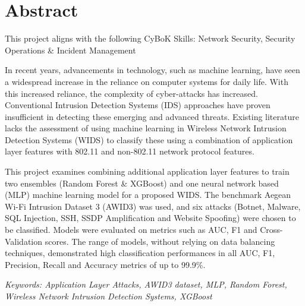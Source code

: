 
\section*{Abstract}
\vspace{1cm}



\begin{center}
	{\small This project aligns with the following CyBoK Skills: Network Security, Security Operations \& Incident Management }
	\vspace{10mm}
\end{center}

 \noindent In recent years, advancements in technology, such as machine learning, have seen a widespread increase in the reliance on computer systems for daily life. With this increased reliance, the complexity of cyber-attacks has increased. Conventional Intrusion Detection Systems (IDS) approaches have proven insufficient in detecting these emerging and advanced threats. Existing literature lacks the assessment of using machine learning in Wireless Network Intrusion Detection Systems (WIDS) to classify these using a combination of application layer features with 802.11 and non-802.11 network protocol features.

\smallskip

This project examines combining additional application layer features to train two ensembles (Random Forest \& XGBoost) and one neural network based (MLP) machine learning model for a proposed WIDS. The benchmark Aegean Wi-Fi Intrusion Dataset 3 (AWID3) was used, and six attacks (Botnet, Malware, SQL Injection, SSH, SSDP Amplification and Website Spoofing) were chosen to be classified. Models were evaluated on metrics such as AUC, F1 and Cross-Validation scores. The range of models, without relying on data balancing techniques, demonstrated high classification performances in all AUC, F1, Precision, Recall and Accuracy metrics of up to 99.9\%.

\vspace{2cm}

 \noindent \textit{Keywords: Application Layer Attacks, AWID3 dataset, MLP, Random Forest, Wireless Network Intrusion Detection Systems, XGBoost}